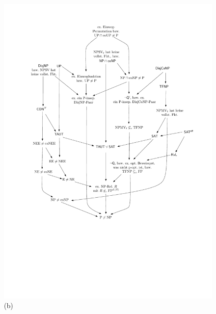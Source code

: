 \begin{figure}[t]
    \noindent
\begin{minipage}{.3\textwidth}
    \centering\includegraphics[page=4]{figures.pdf}\\\smallskip
    (b)
    \end{minipage}
\begin{minipage}{.3\textwidth}

\end{minipage}
\end{figure}
